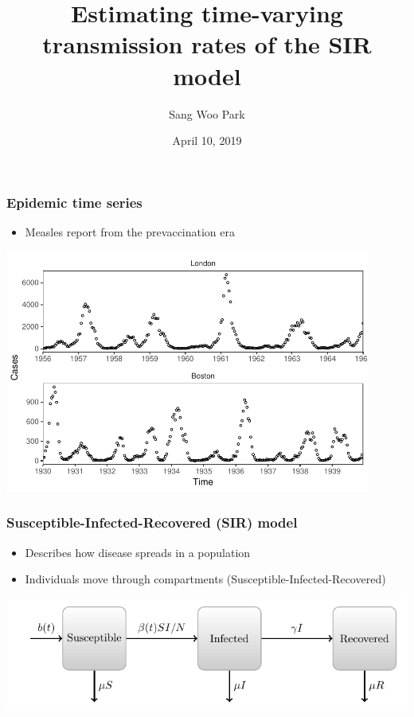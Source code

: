 \documentclass{beamer}
\begin{document}
\title[Parameter estimation] %
{Estimating time-varying transmission rates of the SIR model}

\author[Sang Woo Park] %
{Sang Woo Park}


\date[2019] %
{April 10, 2019}

\frame{\titlepage}

\begin{frame}
\frametitle{Epidemic time series}
\begin{itemize}
    \item Measles report from the prevaccination era
\end{itemize}
\begin{center}
\includegraphics[width=0.9\textwidth]{fig1.pdf}
\end{center}
\end{frame}

\begin{frame}
\frametitle{Susceptible-Infected-Recovered (SIR) model}
\begin{itemize}
    \item Describes how disease spreads in a population
    \item Individuals move through compartments (Susceptible-Infected-Recovered)
\end{itemize}
\begin{center}
\includegraphics[width=\textwidth]{model_diagram.pdf}
\end{center}
\end{frame}
\end{document}
